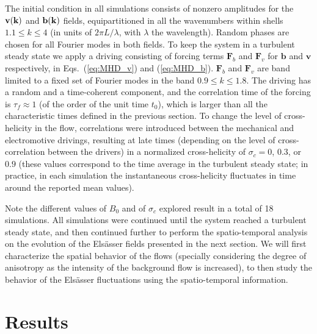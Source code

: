 \documentclass[aip,pop,reprint,amsmath,amssymb,floatfix]{revtex4-1}
\renewcommand{\vec}[1]{\mathbf{#1}}
\begin{document}
The initial condition in all simulations consists of nonzero
amplitudes for the ${\bf v}({\bf k})$ and ${\bf b}({\bf k})$ fields,
equipartitioned in all the wavenumbers within shells
$1.1 \leq k \leq 4$ (in units of $2\pi L/\lambda$, with $\lambda$ the
wavelength). Random phases are chosen for all Fourier modes in both
fields. To keep the system in a turbulent steady state we apply a
driving consisting of forcing terms $\vec{F}_b$ and $\vec{F}_v$ 
for $\vec{b}$ and $\vec{v}$ respectively, in Eqs.~(\ref{eq:MHD_v}) 
and (\ref{eq:MHD_b}). $\vec{F}_b$ and $\vec{F}_v$ are band limited to 
a fixed set of Fourier modes in the band $0.9\leq k \leq 1.8$. The driving has a
random and a time-coherent component, and the correlation time of the
forcing is $\tau_f \approx 1$ (of the order of the unit time
$t_0$), which is larger than all the characteristic times 
defined in the previous section. To change the level of cross-helicity in the flow,
correlations were introduced between the mechanical and electromotive
drivings, resulting at late times (depending on the level of
cross-correlation between the drivers) in a normalized cross-helicity of 
$\sigma_c=0$, $0.3$, or $0.9$ (these values correspond to the time average 
in the turbulent steady state; in practice, in each simulation the
instantaneous cross-helicity fluctuates in time around the reported
mean values).

Note the different values of $B_0$ and of $\sigma_c$ explored result in a
total of 18 simulations. All simulations were continued until the
system reached a turbulent steady state, and then continued further to
perform the spatio-temporal analysis on the evolution of the
Els\"asser fields presented in the next section. We will first
characterize the spatial behavior of the flows (specially considering
the degree of anisotropy as the intensity of the background flow is
increased), to then study the behavior of the Els\"asser fluctuations
using the spatio-temporal information.

\section{Results}\label{sec_results}
\end{document}
